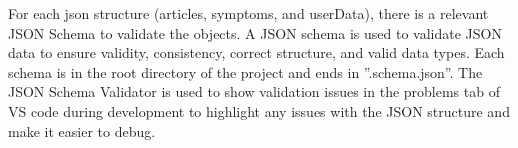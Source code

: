 For each json structure (articles, symptoms, and userData), there is a relevant JSON Schema to validate the objects. A JSON schema is used to validate JSON data to ensure validity, consistency, correct structure, and valid data types\cite{JsonSchema2025}\cite{JsonSchemaOrg2025}. Each schema is in the root directory of the project and ends in ''.schema.json''. The JSON Schema Validator is used to show validation issues in the problems tab of VS code during development to highlight any issues with the JSON structure and make it easier to debug.
